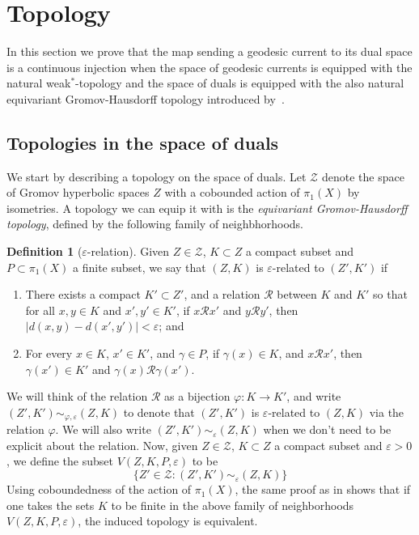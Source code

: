 \documentclass[12pt,article]{amsart}
\numberwithin{equation}{section}
\numberwithin{figure}{section}
\theoremstyle{definition}
\newtheorem{definition}[equation]{Definition}
\theoremstyle{plain}
\renewcommand{\epsilon}{\varepsilon}
\begin{document}
\section{Topology}
\label{sec:topology}

In this section we prove that the map sending a geodesic current to its dual space is a continuous injection  when the space of geodesic currents is equipped with the natural weak$^*$-topology and the space of duals is equipped with the also natural equivariant Gromov-Hausdorff topology introduced by~\cite{Pau88:Thesis}.

\subsection{Topologies in the space of duals}


We start by describing a topology on the space of duals.
Let $\mathcal{Z}$ denote the space of Gromov hyperbolic spaces $Z$ with a cobounded action of $\pi_1(X)$ by isometries.
A topology we can equip it with is the \emph{equivariant Gromov-Hausdorff topology}, defined by the following family of neighbhorhoods.

\begin{definition}[$\epsilon$-relation]
\label{def:equivGH}
Given $Z \in \mathcal{Z}$, $K \subset Z$ a compact subset and  $P \subset \pi_1(X)$ a finite subset, we say that $(Z,K)$ is $\epsilon$-related to $(Z',K')$ if
\begin{enumerate} \item There exists a compact $K' \subset Z'$, and a relation $\mathcal{R}$ between $K$ and $K'$ so that for all $x,y \in K$ and $x',y' \in K'$, if $x \mathcal{R} x'$ and $y \mathcal{R} y'$, then $|d(x,y)-d(x',y')|<\epsilon$; and
\item For every $x \in K$, $x' \in K'$, and $\gamma \in P$, if $\gamma(x) \in K$, and $x \mathcal{R} x'$, then $\gamma(x') \in K'$ and $\gamma(x) \mathcal{R} \gamma(x')$.
\end{enumerate}
We will think of the relation $\mathcal{R}$ as a bijection $\varphi \colon K \to K'$, and write $(Z',K') \sim_{\varphi, \epsilon} (Z,K)$ to denote that  $(Z',K')$ is $\epsilon$-related to $(Z,K)$ via the relation $\varphi$. We will also write $(Z',K') \sim_{\epsilon} (Z,K)$ when we don't need to be explicit about the relation.
Now, given $Z \in \mathcal{Z}$, $K \subset Z$ a compact subset and $\epsilon>0$, we define the subset $V(Z, K, P, \epsilon)$ to be
\[
\{ Z' \in \mathcal{Z} : (Z',K') \sim_{\epsilon} (Z,K)
\}
\]
Using coboundedness of the action of $\pi_1(X)$, the same proof as in \cite[Proposition~4.1]{Pa89:Paulin1989TheGT} shows that if one takes the sets $K$ to be finite in the above family of neighborhoods $V(Z,K,P,\epsilon)$, the induced topology is equivalent.
\end{definition}
\end{document}
